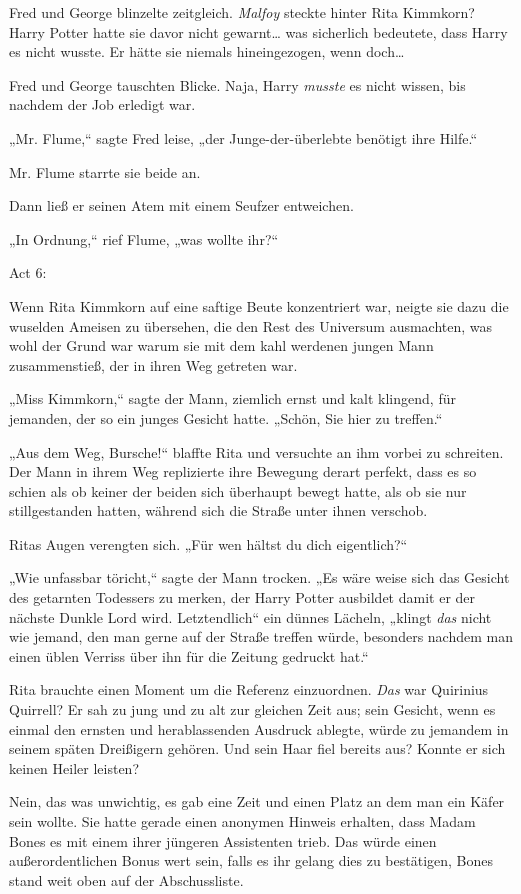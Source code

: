 {Fred und George blinzelte zeitgleich. \emph{Malfoy} steckte hinter Rita Kimmkorn? Harry Potter hatte sie davor nicht gewarnt… was sicherlich bedeutete, dass Harry es nicht wusste. Er hätte sie niemals hineingezogen, wenn doch…

Fred und George tauschten Blicke. Naja, Harry \emph{musste} es nicht wissen, bis nachdem der Job erledigt war.

„Mr. Flume,“ sagte Fred leise, „der Junge-der-überlebte benötigt ihre Hilfe.“

Mr. Flume starrte sie beide an.

Dann ließ er seinen Atem mit einem Seufzer entweichen.

„In Ordnung,“ rief Flume, „was wollte ihr?“

Act 6:

Wenn Rita Kimmkorn auf eine saftige Beute konzentriert war, neigte sie dazu die wuselden Ameisen zu übersehen, die den Rest des Universum ausmachten, was wohl der Grund war warum sie mit dem kahl werdenen jungen Mann zusammenstieß, der in ihren Weg getreten war.

„Miss Kimmkorn,“ sagte der Mann, ziemlich ernst und kalt klingend, für jemanden, der so ein junges Gesicht hatte. „Schön, Sie hier zu treffen.“

„Aus dem Weg, Bursche!“ blaffte Rita und versuchte an ihm vorbei zu schreiten. Der Mann in ihrem Weg replizierte ihre Bewegung derart perfekt, dass es so schien als ob keiner der beiden sich überhaupt bewegt hatte, als ob sie nur stillgestanden hatten, während sich die Straße unter ihnen verschob.

Ritas Augen verengten sich. „Für wen hältst du dich eigentlich?“

„Wie unfassbar töricht,“ sagte der Mann trocken. „Es wäre weise sich das Gesicht des getarnten Todessers zu merken, der Harry Potter ausbildet damit er der nächste Dunkle Lord wird. Letztendlich“ ein dünnes Lächeln, „klingt \emph{das} nicht wie jemand, den man gerne auf der Straße treffen würde, besonders nachdem man einen üblen Verriss über ihn für die Zeitung gedruckt hat.“

Rita brauchte einen Moment um die Referenz einzuordnen. \emph{Das} war Quirinius Quirrell? Er sah zu jung und zu alt zur gleichen Zeit aus; sein Gesicht, wenn es einmal den ernsten und herablassenden Ausdruck ablegte, würde zu jemandem in seinem späten Dreißigern gehören. Und sein Haar fiel bereits aus? Konnte er sich keinen Heiler leisten?

Nein, das was unwichtig, es gab eine Zeit und einen Platz an dem man ein Käfer sein wollte. Sie hatte gerade einen anonymen Hinweis erhalten, dass Madam Bones es mit einem ihrer jüngeren Assistenten trieb. Das würde einen außerordentlichen Bonus wert sein, falls es ihr gelang dies zu bestätigen, Bones stand weit oben auf der Abschussliste.

}
